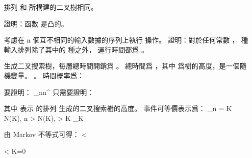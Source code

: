 \startANSWER
排列  和  所構建的二叉樹相同。
\stopANSWER

\startEXERCISE
證明：函數  是凸的。
\stopEXERCISE

\startANSWER
{}
\stopANSWER

\startEXERCISE\DIFFICULT
考慮在 n 個互不相同的輸入數據的序列上執行  操作。
證明：對於任何常數 ，  種輸入排列除了其中的  種之外，
運行時間都爲 。
\stopEXERCISE

\startANSWER
{} 生成二叉搜索樹，每層總時間開銷爲 。
總時間爲 ，其中  爲樹的高度，是一個隨機變量。
 。
  時間概率爲：
\startformula
 \Pr{}
\stopformula

要證明：
\startformula
\forall\rho
  \lim_{n\rightarrow\infty}n^\rho
  \Pr{}
\stopformula
只需要證明：
\startformula
 \Pr{}
\stopformula

其中  表示  的排列  生成的二叉搜索樹的高度。
事件可等價表示爲：
\startformula\startmathalignment
\NC  \NC \lim_{n\rightarrow\infty} = \infty \NR
\NC \Leftrightarrow \NC \forall K \exists N(K), n > N(K),  > K \NR
\NC \Leftrightarrow \NC \bigcap_{K} \NR
\stopmathalignment\stopformula

由 Markov 不等式可得：
\startformula
\Pr{} < 
\stopformula

\startformula
\Pr{} <  \forall K=0
\stopformula

\stopANSWER

\stopsection
